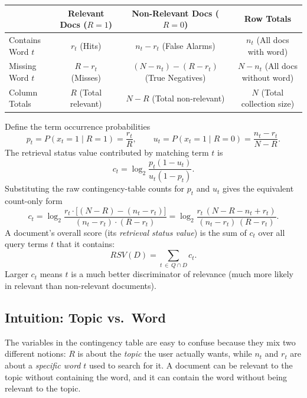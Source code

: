 \documentclass[11pt, a4paper]{article}
\begin{document}
\begin{center}
\begin{tabular}{@{}lccc@{}}
\toprule
 & Relevant Docs ($R=1$) & Non-Relevant Docs ($R=0$) & Row Totals \\
\midrule
Contains Word $t$ & $r_t$ (Hits) & $n_t - r_t$ (False Alarms) & $n_t$ (All docs with word) \\
Missing Word $t$  & $R - r_t$ (Misses) & $(N - n_t) - (R - r_t)$ (True Negatives) & $N - n_t$ (All docs without word) \\
\midrule
Column Totals & $R$ (Total relevant) & $N-R$ (Total non-relevant) & $N$ (Total collection size) \\
\bottomrule
\end{tabular}
\end{center}

\begin{formulabox}
Define the term occurrence probabilities
\[
p_t = P(x_t=1\mid R=1) = \frac{r_t}{R}, \qquad u_t = P(x_t=1\mid R=0) = \frac{n_t-r_t}{N-R}.
\]
The retrieval status value contributed by matching term $t$ is
\[
c_t = \log_2 \frac{p_t(1-u_t)}{u_t(1-p_t)}.
\]
Substituting the raw contingency-table counts for $p_t$ and $u_t$ gives the equivalent count-only form
\[
c_t = \log_2 \frac{r_t \cdot \big[(N-R) - (n_t - r_t)\big]}{(n_t - r_t)\cdot(R - r_t)} = \log_2 \frac{r_t \,(N - R - n_t + r_t)}{(n_t - r_t)\,(R - r_t)}.
\]
A document's overall score (its \emph{retrieval status value}) is the sum of $c_t$ over all query terms $t$ that it contains:
\[
RSV(D) = \sum_{t \,\in\, Q \cap D} c_t.
\]
Larger $c_t$ means $t$ is a much better discriminator of relevance (much more likely in relevant than non-relevant documents).
\end{formulabox}

\subsection{Intuition: Topic vs.\ Word}

The variables in the contingency table are easy to confuse because they mix two different notions: $R$ is about the \emph{topic} the user actually wants, while $n_t$ and $r_t$ are about a \emph{specific word} $t$ used to search for it. A document can be relevant to the topic without containing the word, and it can contain the word without being relevant to the topic.
\end{document}
